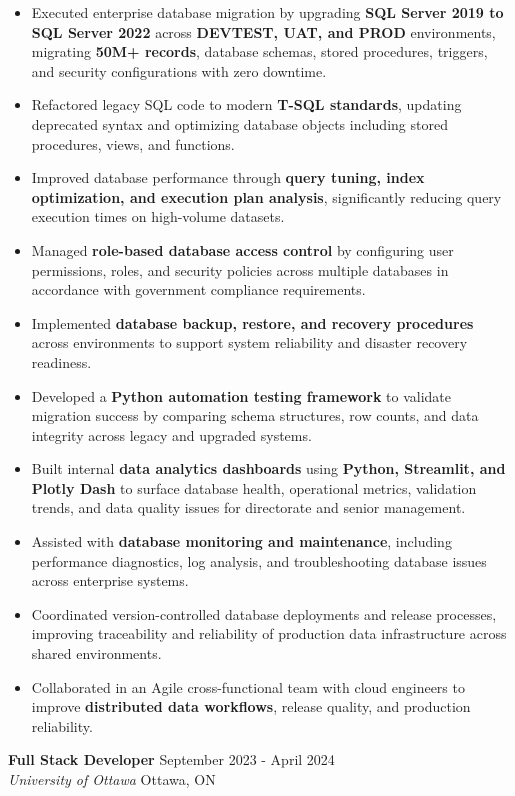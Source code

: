 \documentclass[a4paper]{article}
\begin{document}
\begin{itemize} \itemsep -2pt
\item Executed enterprise database migration by upgrading \textbf{SQL Server 2019 to SQL Server 2022} across \textbf{DEVTEST, UAT, and PROD} environments, migrating \textbf{50M+ records}, database schemas, stored procedures, triggers, and security configurations with zero downtime.
\item Refactored legacy SQL code to modern \textbf{T-SQL standards}, updating deprecated syntax and optimizing database objects including stored procedures, views, and functions.
\item Improved database performance through \textbf{query tuning, index optimization, and execution plan analysis}, significantly reducing query execution times on high-volume datasets.
\item Managed \textbf{role-based database access control} by configuring user permissions, roles, and security policies across multiple databases in accordance with government compliance requirements.
\item Implemented \textbf{database backup, restore, and recovery procedures} across environments to support system reliability and disaster recovery readiness.
\item Developed a \textbf{Python automation testing framework} to validate migration success by comparing schema structures, row counts, and data integrity across legacy and upgraded systems.
\item Built internal \textbf{data analytics dashboards} using \textbf{Python, Streamlit, and Plotly Dash} to surface database health, operational metrics, validation trends, and data quality issues for directorate and senior management.
\item Assisted with \textbf{database monitoring and maintenance}, including performance diagnostics, log analysis, and troubleshooting database issues across enterprise systems.
\item Coordinated version-controlled database deployments and release processes, improving traceability and reliability of production data infrastructure across shared environments.
\item Collaborated in an Agile cross-functional team with cloud engineers to improve \textbf{distributed data workflows}, release quality, and production reliability.
\end{itemize}
\textbf{Full Stack Developer} \hfill September 2023 - April 2024\\
\textit{University of Ottawa} \hfill Ottawa, ON\\
\end{document}
